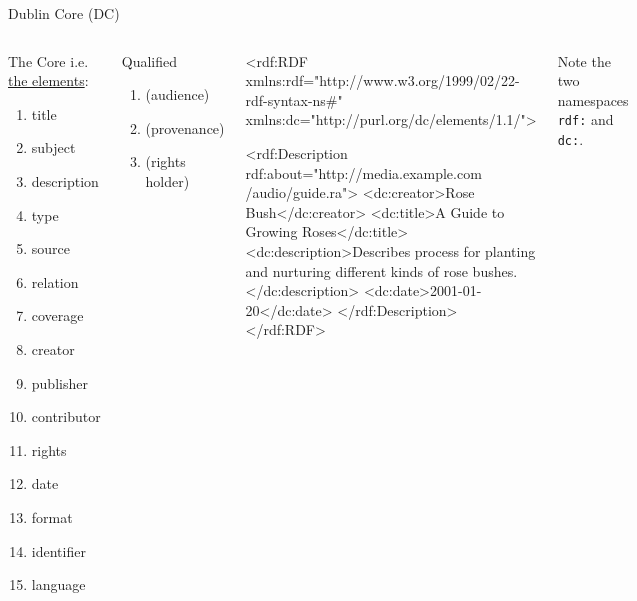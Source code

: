 \begin{frame}{Dublin Core (DC)}
\begin{columns}
\begin{block}{The Core}\footnotesize
i.e. \href{https://www.dublincore.org/specifications/dublin-core/usageguide/elements/}{the elements}:
\begin{enumerate}\scriptsize
    \item title
    \item subject
    \item description
    \item type 
    \item source 
    \item relation 
    \item coverage
    \item creator
    \item publisher
    \item contributor
    \item rights
    \item date 
    \item format
    \item identifier 
    \item language
\end{enumerate}
\end{block}


\begin{block}{Qualified}
\begin{enumerate}\scriptsize
    \item (audience)
    \item (provenance)
    \item (rights holder)
\end{enumerate}
\end{block}
\begin{xmlcode}
<rdf:RDF 
  xmlns:rdf="http://www.w3.org/1999/02/22-rdf-syntax-ns#"
  xmlns:dc="http://purl.org/dc/elements/1.1/">

   <rdf:Description rdf:about="http://media.example.com
                               /audio/guide.ra">
      <dc:creator>Rose Bush</dc:creator>
      <dc:title>A Guide to Growing Roses</dc:title>
      <dc:description>Describes process for 
        planting and nurturing different kinds 
        of rose bushes.</dc:description> 
      <dc:date>2001-01-20</dc:date>
   </rdf:Description> 
</rdf:RDF>
\end{xmlcode}
{\scriptsize Note the two namespaces \texttt{rdf:} and \texttt{dc:}.}
\end{columns}
\end{frame}

